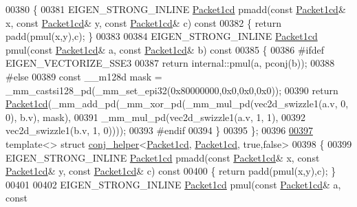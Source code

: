 \begin{DoxyCode}
00380 \{
00381   EIGEN\_STRONG\_INLINE \hyperlink{struct_eigen_1_1internal_1_1_packet1cd}{Packet1cd} pmadd(\textcolor{keyword}{const} \hyperlink{struct_eigen_1_1internal_1_1_packet1cd}{Packet1cd}& x, \textcolor{keyword}{const} 
      \hyperlink{struct_eigen_1_1internal_1_1_packet1cd}{Packet1cd}& y, \textcolor{keyword}{const} \hyperlink{struct_eigen_1_1internal_1_1_packet1cd}{Packet1cd}& c)\textcolor{keyword}{ const}
00382 \textcolor{keyword}{  }\{ \textcolor{keywordflow}{return} padd(pmul(x,y),c); \}
00383 
00384   EIGEN\_STRONG\_INLINE \hyperlink{struct_eigen_1_1internal_1_1_packet1cd}{Packet1cd} pmul(\textcolor{keyword}{const} \hyperlink{struct_eigen_1_1internal_1_1_packet1cd}{Packet1cd}& a, \textcolor{keyword}{const} 
      \hyperlink{struct_eigen_1_1internal_1_1_packet1cd}{Packet1cd}& b)\textcolor{keyword}{ const}
00385 \textcolor{keyword}{  }\{
00386 \textcolor{preprocessor}{    #ifdef EIGEN\_VECTORIZE\_SSE3}
00387     \textcolor{keywordflow}{return} internal::pmul(a, pconj(b));
00388 \textcolor{preprocessor}{    #else}
00389     \textcolor{keyword}{const} \_\_m128d mask = \_mm\_castsi128\_pd(\_mm\_set\_epi32(0x80000000,0x0,0x0,0x0));
00390     \textcolor{keywordflow}{return} \hyperlink{struct_eigen_1_1internal_1_1_packet1cd}{Packet1cd}(\_mm\_add\_pd(\_mm\_xor\_pd(\_mm\_mul\_pd(vec2d\_swizzle1(a.v, 0, 0), b.v), mask),
00391                                 \_mm\_mul\_pd(vec2d\_swizzle1(a.v, 1, 1),
00392                                            vec2d\_swizzle1(b.v, 1, 0))));
00393 \textcolor{preprocessor}{    #endif}
00394   \}
00395 \};
00396 
\hyperlink{struct_eigen_1_1internal_1_1conj__helper_3_01_packet1cd_00_01_packet1cd_00_01true_00_01false_01_4}{00397} \textcolor{keyword}{template}<> \textcolor{keyword}{struct }\hyperlink{struct_eigen_1_1internal_1_1conj__helper}{conj\_helper}<\hyperlink{struct_eigen_1_1internal_1_1_packet1cd}{Packet1cd}, \hyperlink{struct_eigen_1_1internal_1_1_packet1cd}{Packet1cd}, true,false>
00398 \{
00399   EIGEN\_STRONG\_INLINE \hyperlink{struct_eigen_1_1internal_1_1_packet1cd}{Packet1cd} pmadd(\textcolor{keyword}{const} \hyperlink{struct_eigen_1_1internal_1_1_packet1cd}{Packet1cd}& x, \textcolor{keyword}{const} 
      \hyperlink{struct_eigen_1_1internal_1_1_packet1cd}{Packet1cd}& y, \textcolor{keyword}{const} \hyperlink{struct_eigen_1_1internal_1_1_packet1cd}{Packet1cd}& c)\textcolor{keyword}{ const}
00400 \textcolor{keyword}{  }\{ \textcolor{keywordflow}{return} padd(pmul(x,y),c); \}
00401 
00402   EIGEN\_STRONG\_INLINE \hyperlink{struct_eigen_1_1internal_1_1_packet1cd}{Packet1cd} pmul(\textcolor{keyword}{const} \hyperlink{struct_eigen_1_1internal_1_1_packet1cd}{Packet1cd}& a, \textcolor{keyword}{const} 

\end{DoxyCode}
